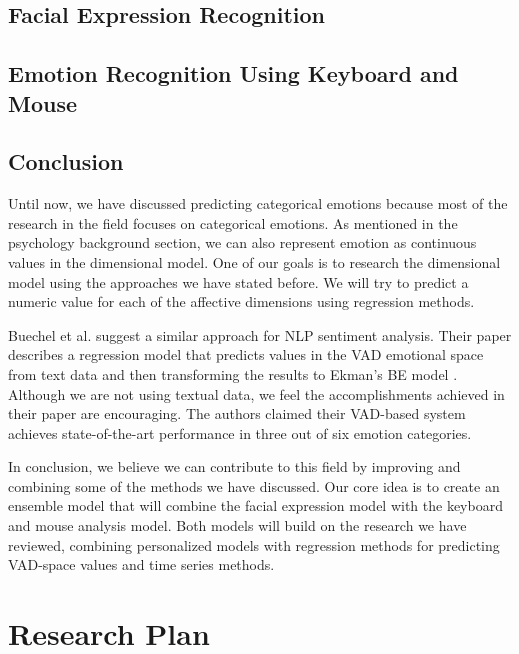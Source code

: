 \documentclass{article}
\begin{document}
\subsection{Facial Expression Recognition} \label{section:fer}


\subsection{Emotion Recognition Using Keyboard and Mouse} \label{section:keyboard_mouse}


\subsection{Conclusion}

Until now, we have discussed predicting categorical emotions because most of the research in the 
field focuses on categorical emotions. As mentioned in the psychology background section, 
we can also represent emotion as continuous values in the dimensional model. 
One of our goals is to research the dimensional model using the approaches we have stated before. 
We will try to predict a numeric value for each of the affective dimensions using 
regression methods.
\par

Buechel et al. \cite{emotion_regression} suggest a similar approach for NLP sentiment analysis. 
Their paper describes a regression model that predicts values in the VAD emotional 
space \cite{VAD_model} from text data and then transforming the results to Ekman's BE model \cite{Ekman_Theory}. 
Although we are not using textual data, we feel the accomplishments achieved in their 
paper are encouraging. The authors claimed their VAD-based system achieves state-of-the-art 
performance in three out of six emotion categories.
\par

In conclusion, we believe we can contribute to this field by improving and combining some of the 
methods we have discussed. Our core idea is to create an ensemble model that will combine the 
facial expression model with the keyboard and mouse analysis model. 
Both models will build on the research we have reviewed, combining personalized models with 
regression methods for predicting VAD-space values and time series methods.

\newpage

\section{Research Plan}

\end{document}
